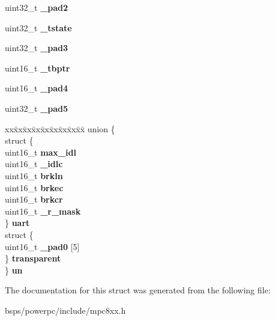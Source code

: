 \begin{DoxyCompactItemize}
uint32\+\_\+t {\bfseries \+\_\+pad2}
\item 
\mbox{\label{structm8xxSMCparms___ab64eb70d86df34d16bbac60d20e9b0cd}} 
uint32\+\_\+t {\bfseries \+\_\+tstate}
\item 
\mbox{\label{structm8xxSMCparms___a6f5f30734aea677e94a8828206c44745}} 
uint32\+\_\+t {\bfseries \+\_\+pad3}
\item 
\mbox{\label{structm8xxSMCparms___ada59606438820e8c355f850762d225d4}} 
uint16\+\_\+t {\bfseries \+\_\+tbptr}
\item 
\mbox{\label{structm8xxSMCparms___a67ad57a8187767fbfd6dd1f47fb3b51b}} 
uint16\+\_\+t {\bfseries \+\_\+pad4}
\item 
\mbox{\label{structm8xxSMCparms___a9c44de6d80d29d107028ff244818ef10}} 
uint32\+\_\+t {\bfseries \+\_\+pad5}
\item 
\mbox{\label{structm8xxSMCparms___a11220852a3f446513e401609b36753bf}} 
\begin{tabbing}
xx\=xx\=xx\=xx\=xx\=xx\=xx\=xx\=xx\=\kill
union \{\\
\>struct \{\\
\>\>uint16\_t {\bfseries max\_idl}\\
\>\>uint16\_t {\bfseries \_idlc}\\
\>\>uint16\_t {\bfseries brkln}\\
\>\>uint16\_t {\bfseries brkec}\\
\>\>uint16\_t {\bfseries brkcr}\\
\>\>uint16\_t {\bfseries \_r\_mask}\\
\>\} {\bfseries uart}\\
\>struct \{\\
\>\>uint16\_t {\bfseries \_pad0} \mbox{[}5\mbox{]}\\
\>\} {\bfseries transparent}\\
\} {\bfseries un}\\

\end{tabbing}\end{DoxyCompactItemize}


The documentation for this struct was generated from the following file\+:\begin{DoxyCompactItemize}
\item 
bsps/powerpc/include/mpc8xx.\+h\end{DoxyCompactItemize}
